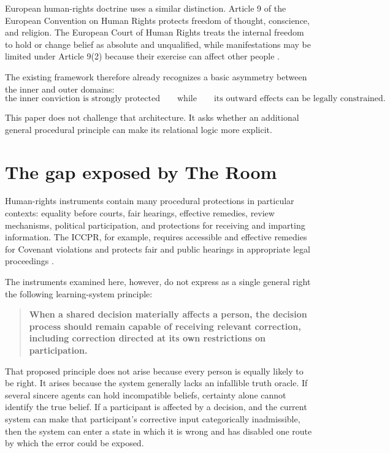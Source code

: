 \documentclass[11pt,a4paper]{article}
\begin{document}
European human-rights doctrine uses a similar distinction. Article 9 of the European Convention on Human Rights protects freedom of thought, conscience, and religion. The European Court of Human Rights treats the internal freedom to hold or change belief as absolute and unqualified, while manifestations may be limited under Article 9(2) because their exercise can affect other people \cite{echr9guide}.

The existing framework therefore already recognizes a basic asymmetry between the inner and outer domains:
\[
\boxed{\text{the inner conviction is strongly protected}}
\qquad\text{while}\qquad
\boxed{\text{its outward effects can be legally constrained}.}
\]

This paper does not challenge that architecture. It asks whether an additional general procedural principle can make its relational logic more explicit.

\section{The gap exposed by The Room}

Human-rights instruments contain many procedural protections in particular contexts: equality before courts, fair hearings, effective remedies, review mechanisms, political participation, and protections for receiving and imparting information. The ICCPR, for example, requires accessible and effective remedies for Covenant violations and protects fair and public hearings in appropriate legal proceedings \cite{iccpr,gc31}.

The instruments examined here, however, do not express as a single general right the following learning-system principle:
\begin{quote}
\textbf{When a shared decision materially affects a person, the decision process should remain capable of receiving relevant correction, including correction directed at its own restrictions on participation.}
\end{quote}

That proposed principle does not arise because every person is equally likely to be right. It arises because the system generally lacks an infallible truth oracle. If several sincere agents can hold incompatible beliefs, certainty alone cannot identify the true belief. If a participant is affected by a decision, and the current system can make that participant's corrective input categorically inadmissible, then the system can enter a state in which it is wrong and has disabled one route by which the error could be exposed.
\end{document}
